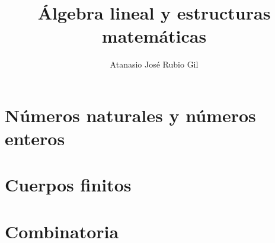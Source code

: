 \documentclass[10pt, a4paper]{aqademic}
\author{Atanasio José Rubio Gil}
\title{Álgebra lineal y estructuras matemáticas}
\begin{document}
\AqMaketitle[%
	cover    = logo-ugr.png,
	org      = Grado en Ingeniería Informática,
	subtitle = Teoría,
	url      = https://github.com/Groctel/ugr-informatica
]


\tableofcontents

\chapter{Números naturales y números enteros}\label{numeros-naturales-y-numeros-enteros}
	 \pagebreak
	
	
	
	
	
	

\chapter{Cuerpos finitos}\label{cuerpos-finitos}
	
	

\chapter{Combinatoria}\label{combinatoria}
	
	
	
\end{document}
